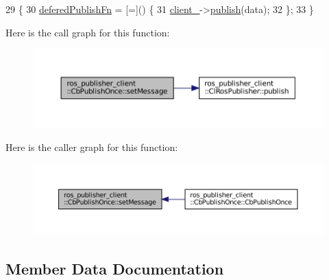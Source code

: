 \begin{DoxyCode}
29     \{
30         \hyperlink{classros__publisher__client_1_1CbPublishOnce_a91e0e3d574d25e160bcb3a4ca81bb0b2}{deferedPublishFn} = [=]() \{
31             \hyperlink{classros__publisher__client_1_1CbPublishOnce_a50a1b2a4892ad780406231e0f870746a}{client\_}->\hyperlink{classros__publisher__client_1_1ClRosPublisher_a9e62a3581a730cd2e287e560d04d151b}{publish}(data);
32         \};
33     \}
\end{DoxyCode}
Here is the call graph for this function\+:
\nopagebreak
\begin{figure}[H]
\begin{center}
\leavevmode
\includegraphics[width=350pt]{classros__publisher__client_1_1CbPublishOnce_a06bef500e116390ee85a790401e600d8_cgraph}
\end{center}
\end{figure}
Here is the caller graph for this function\+:
\nopagebreak
\begin{figure}[H]
\begin{center}
\leavevmode
\includegraphics[width=350pt]{classros__publisher__client_1_1CbPublishOnce_a06bef500e116390ee85a790401e600d8_icgraph}
\end{center}
\end{figure}


\subsection{Member Data Documentation}
\mbox{\label{classros__publisher__client_1_1CbPublishOnce_a50a1b2a4892ad780406231e0f870746a}} 
